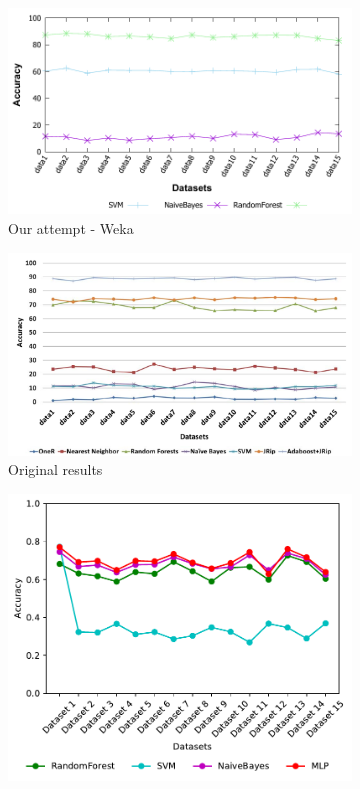 \begin{figure}[H]
    \centering
    \begin{subfigure}[t]{0.4\textwidth}
        \includegraphics[width=\linewidth]{images/weka_accuracyall}
        \caption{Our attempt - Weka}
    \end{subfigure}%
    \begin{subfigure}[t]{0.4\textwidth}
        \includegraphics[width=\linewidth]{images/weka_accuracyall_cite.png}
        \caption{Original results \cite{borges_hink_machine_2014-1}}
    \end{subfigure}
    \begin{subfigure}[t]{0.4\textwidth}
        \includegraphics[width=\linewidth, page = 3]{images/accuracy}

\end{subfigure}
\end{figure}

